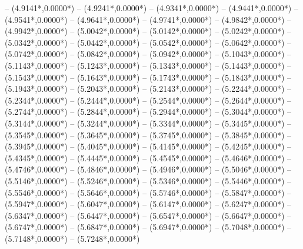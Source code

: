 {	-- ({4.9141*\dx},{0.0000*\dy})
	-- ({4.9241*\dx},{0.0000*\dy})
	-- ({4.9341*\dx},{0.0000*\dy})
	-- ({4.9441*\dx},{0.0000*\dy})
	-- ({4.9541*\dx},{0.0000*\dy})
	-- ({4.9641*\dx},{0.0000*\dy})
	-- ({4.9741*\dx},{0.0000*\dy})
	-- ({4.9842*\dx},{0.0000*\dy})
	-- ({4.9942*\dx},{0.0000*\dy})
	-- ({5.0042*\dx},{0.0000*\dy})
	-- ({5.0142*\dx},{0.0000*\dy})
	-- ({5.0242*\dx},{0.0000*\dy})
	-- ({5.0342*\dx},{0.0000*\dy})
	-- ({5.0442*\dx},{0.0000*\dy})
	-- ({5.0542*\dx},{0.0000*\dy})
	-- ({5.0642*\dx},{0.0000*\dy})
	-- ({5.0742*\dx},{0.0000*\dy})
	-- ({5.0842*\dx},{0.0000*\dy})
	-- ({5.0942*\dx},{0.0000*\dy})
	-- ({5.1043*\dx},{0.0000*\dy})
	-- ({5.1143*\dx},{0.0000*\dy})
	-- ({5.1243*\dx},{0.0000*\dy})
	-- ({5.1343*\dx},{0.0000*\dy})
	-- ({5.1443*\dx},{0.0000*\dy})
	-- ({5.1543*\dx},{0.0000*\dy})
	-- ({5.1643*\dx},{0.0000*\dy})
	-- ({5.1743*\dx},{0.0000*\dy})
	-- ({5.1843*\dx},{0.0000*\dy})
	-- ({5.1943*\dx},{0.0000*\dy})
	-- ({5.2043*\dx},{0.0000*\dy})
	-- ({5.2143*\dx},{0.0000*\dy})
	-- ({5.2244*\dx},{0.0000*\dy})
	-- ({5.2344*\dx},{0.0000*\dy})
	-- ({5.2444*\dx},{0.0000*\dy})
	-- ({5.2544*\dx},{0.0000*\dy})
	-- ({5.2644*\dx},{0.0000*\dy})
	-- ({5.2744*\dx},{0.0000*\dy})
	-- ({5.2844*\dx},{0.0000*\dy})
	-- ({5.2944*\dx},{0.0000*\dy})
	-- ({5.3044*\dx},{0.0000*\dy})
	-- ({5.3144*\dx},{0.0000*\dy})
	-- ({5.3244*\dx},{0.0000*\dy})
	-- ({5.3344*\dx},{0.0000*\dy})
	-- ({5.3445*\dx},{0.0000*\dy})
	-- ({5.3545*\dx},{0.0000*\dy})
	-- ({5.3645*\dx},{0.0000*\dy})
	-- ({5.3745*\dx},{0.0000*\dy})
	-- ({5.3845*\dx},{0.0000*\dy})
	-- ({5.3945*\dx},{0.0000*\dy})
	-- ({5.4045*\dx},{0.0000*\dy})
	-- ({5.4145*\dx},{0.0000*\dy})
	-- ({5.4245*\dx},{0.0000*\dy})
	-- ({5.4345*\dx},{0.0000*\dy})
	-- ({5.4445*\dx},{0.0000*\dy})
	-- ({5.4545*\dx},{0.0000*\dy})
	-- ({5.4646*\dx},{0.0000*\dy})
	-- ({5.4746*\dx},{0.0000*\dy})
	-- ({5.4846*\dx},{0.0000*\dy})
	-- ({5.4946*\dx},{0.0000*\dy})
	-- ({5.5046*\dx},{0.0000*\dy})
	-- ({5.5146*\dx},{0.0000*\dy})
	-- ({5.5246*\dx},{0.0000*\dy})
	-- ({5.5346*\dx},{0.0000*\dy})
	-- ({5.5446*\dx},{0.0000*\dy})
	-- ({5.5546*\dx},{0.0000*\dy})
	-- ({5.5646*\dx},{0.0000*\dy})
	-- ({5.5746*\dx},{0.0000*\dy})
	-- ({5.5847*\dx},{0.0000*\dy})
	-- ({5.5947*\dx},{0.0000*\dy})
	-- ({5.6047*\dx},{0.0000*\dy})
	-- ({5.6147*\dx},{0.0000*\dy})
	-- ({5.6247*\dx},{0.0000*\dy})
	-- ({5.6347*\dx},{0.0000*\dy})
	-- ({5.6447*\dx},{0.0000*\dy})
	-- ({5.6547*\dx},{0.0000*\dy})
	-- ({5.6647*\dx},{0.0000*\dy})
	-- ({5.6747*\dx},{0.0000*\dy})
	-- ({5.6847*\dx},{0.0000*\dy})
	-- ({5.6947*\dx},{0.0000*\dy})
	-- ({5.7048*\dx},{0.0000*\dy})
	-- ({5.7148*\dx},{0.0000*\dy})
	-- ({5.7248*\dx},{0.0000*\dy})
}

